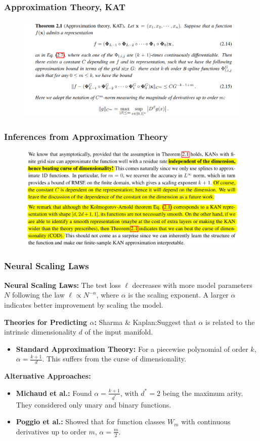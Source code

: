 \documentclass[serif, aspectratio=169]{beamer}
\begin{document}
\begin{frame}
    \frametitle<presentation>{Approximation Theory, KAT}
    \begin{figure}
        \centering
        \includegraphics[height=5cm]{image copy 15.png}
    \end{figure}
\end{frame}
\begin{frame}
    \frametitle<presentation>{Inferences from Approximation Theory}
    \begin{figure}
        \centering
        \includegraphics[height=5cm]{image copy 17.png}
    \end{figure}
\end{frame}
\begin{frame}
    \frametitle<presentation>{Neural Scaling Laws}
    \textbf{Neural Scaling Laws:} The test loss \( \ell \) decreases with more model parameters \( N \) following the law \( \ell \propto N^{-\alpha} \), where \( \alpha \) is the scaling exponent. A larger \( \alpha \) indicates better improvement by scaling the model.

    \textbf{Theories for Predicting \( \alpha \):} Sharma \& Kaplan:Suggest that \( \alpha \) is related to the intrinsic dimensionality \( d \) of the input manifold.
    \begin{itemize}
        \item \textbf{Standard Approximation Theory:} For a piecewise polynomial of order \( k \), \( \alpha = \frac{k+1}{d} \). This suffers from the curse of dimensionality.
    \end{itemize}

    \textbf{Alternative Approaches:}
    \begin{itemize}
        \item \textbf{Michaud et al.:} Found \( \alpha = \frac{k+1}{d^*} \), with \( d^* = 2 \) being the maximum arity. They considered only unary and binary functions.
        \item \textbf{Poggio et al.:} Showed that for function classes \( W_m \) with continuous derivatives up to order \( m \), \( \alpha = \frac{m}{2} \).
    \end{itemize}
\end{frame}
\end{document}
